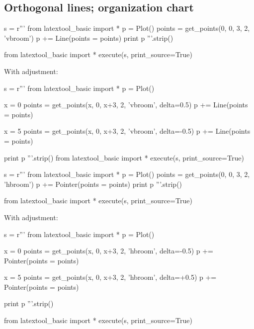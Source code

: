 \subsection{Orthogonal lines; organization chart}

\begin{python}
s = r'''
from latextool_basic import *
p = Plot()
points = get_points(0, 0, 3, 2, 'vbroom')
p += Line(points = points)
print p
'''.strip()

from latextool_basic import *
execute(s, print_source=True)
\end{python}

With adjustment:
\begin{python}
s = r'''
from latextool_basic import *
p = Plot()

x = 0
points = get_points(x, 0, x+3, 2, 'vbroom', delta=0.5)
p += Line(points = points)

x = 5
points = get_points(x, 0, x+3, 2, 'vbroom', delta=-0.5)
p += Line(points = points)

print p
'''.strip()
from latextool_basic import *
execute(s, print_source=True)
\end{python}


\newpage
\begin{python}
s = r'''
from latextool_basic import *
p = Plot()
points = get_points(0, 0, 3, 2, 'hbroom')
p += Pointer(points = points)
print p
'''.strip()

from latextool_basic import *
execute(s, print_source=True)
\end{python}




With adjustment:
\begin{python}
s = r'''
from latextool_basic import *
p = Plot()

x = 0
points = get_points(x, 0, x+3, 2, 'hbroom', delta=-0.5)
p += Pointer(points = points)

x = 5
points = get_points(x, 0, x+3, 2, 'hbroom', delta=+0.5)
p += Pointer(points = points)

print p
'''.strip()

from latextool_basic import *
execute(s, print_source=True)
\end{python}




